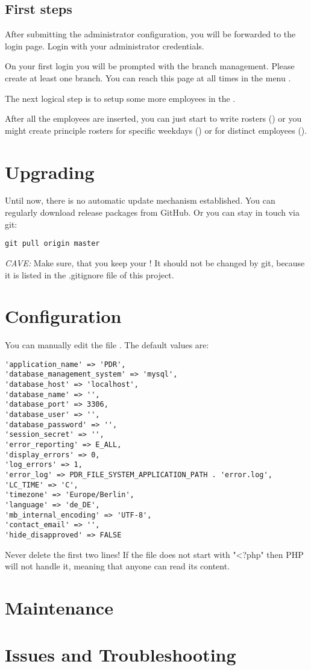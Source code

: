 \subsection{First steps}
After submitting the administrator configuration, you will be forwarded to the login page.
Login with your administrator credentials.

On your first login you will be prompted with the branch management. 
Please create at least one branch. You can reach this page at all times in the menu .

The next logical step is to setup some more employees in the .

After all the employees are inserted, you can just start to write rosters () or you might create principle rosters for specific weekdays () or for distinct employees ().

\section{Upgrading}
Until now, there is no automatic update mechanism established.
You can regularly download release packages from GitHub. Or you can stay in touch via git:
\begin{lstlisting}
git pull origin master
\end{lstlisting}
\emph{CAVE:} Make sure, that you keep your ! It should not be changed by git, because it is listed in the .gitignore file of this project.
\section{Configuration}
You can manually edit the file .
The default values are:
\begin{verbatim}
'application_name' => 'PDR',
'database_management_system' => 'mysql',
'database_host' => 'localhost',
'database_name' => '',
'database_port' => 3306,
'database_user' => '',
'database_password' => '',
'session_secret' => '',
'error_reporting' => E_ALL,
'display_errors' => 0,
'log_errors' => 1,
'error_log' => PDR_FILE_SYSTEM_APPLICATION_PATH . 'error.log',
'LC_TIME' => 'C',
'timezone' => 'Europe/Berlin',
'language' => 'de_DE',
'mb_internal_encoding' => 'UTF-8',
'contact_email' => '',
'hide_disapproved' => FALSE
\end{verbatim}


Never delete the first two lines! If the file does not start with "<?php" then PHP will not handle it, meaning that anyone can read its content. 
\section{Maintenance}
\section{Issues and Troubleshooting}


